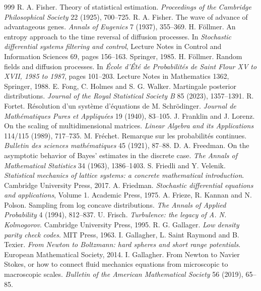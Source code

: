 \begin{thebibliography}{999}
 R. A. Fisher. Theory of statistical estimation. \emph{Proceedings of the Cambridge Philosophical Society} 22 (1925), 700--725.
 R. A. Fisher. The wave of advance of advantageous genes. \emph{Annals of Eugenics} 7 (1937), 355--369.
 H. F\"ollmer. An entropy approach to the time reversal of diffusion processes. In \emph{Stochastic differential systems filtering and control}, Lecture Notes in Control and Information Sciences 69, pages 156--163. Springer, 1985.
 H. F\"ollmer. Random fields and diffusion processes. In \emph{\'Ecole d'\'Et\'e de Probabilit\'es de Saint Flour XV to XVII, 1985 to 1987}, pages 101--203. Lecture Notes in Mathematics 1362, Springer, 1988.
 E. Fong, C. Holmes and S. G. Walker. Martingale posterior distributions. \emph{Journal of the Royal Statistical Society B} 85 (2023), 1357--1391.
 R. Fortet. R\'esolution d'un syst\`eme d'\'equations de M. Schr\"odinger. \emph{Journal de Math\'ematiques Pures et Appliqu\'ees} 19 (1940), 83--105.
 J. Franklin and J. Lorenz. On the scaling of multidimensional matrices. \emph{Linear Algebra and its Applications} 114/115 (1989), 717--735.
 M. Fr\'echet. Remarque sur les probabilit\'es continues. \emph{Bulletin des sciences math\'ematiques} 45 (1921), 87--88.
 D. A. Freedman. On the asymptotic behavior of Bayes' estimates in the discrete case. \emph{The Annals of Mathematical Statistics} 34 (1963), 1386--1403.
 S. Friedli and Y. Velenik. \emph{Statistical mechanics of lattice systems: a concrete mathematical introduction}. Cambridge University Press, 2017.
 A. Friedman. \emph{Stochastic differential equations and applications}, Volume 1. Academic Press, 1975.
 A. Frieze, R. Kannan and N. Polson. Sampling from log concave distributions. \emph{The Annals of Applied Probability} 4 (1994), 812--837.
 U. Frisch. \emph{Turbulence: the legacy of A. N. Kolmogorov}. Cambridge University Press, 1995.
 R. G. Gallager. \emph{Low density parity check codes}. MIT Press, 1963.
 I. Gallagher, L. Saint Raymond and B. Texier. \emph{From Newton to Boltzmann: hard spheres and short range potentials}. European Mathematical Society, 2014.
 I. Gallagher. From Newton to Navier Stokes, or how to connect fluid mechanics equations from microscopic to macroscopic scales. \emph{Bulletin of the American Mathematical Society} 56 (2019), 65--85.

\end{thebibliography}
